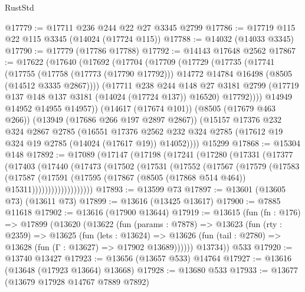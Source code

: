 \begin{lexlean}{RustStd}
\begin{coremodule}
@17779 := @17711 @236 @244 @22 @27 @3345 @2799
@17786 := @17719 @115 @22 @115 @3345 (@14024 (@17724 @115))
@17788 := @14032 (@14033 @3345)
@17790 := @17779 (@17786 @17788)
@17792 := @14143 @17648 @2562
@17867 := @17622
    (@17640
      (@17692
        (@17704
          (@17709
            (@17729
              (@17735
                (@17741
                  (@17755
                    (@17758 (@17773 (@17790 @17792)))
                    @14772
                    @14784
                    @16498
                    (@8505 (@14512 @3335 @2867))))
                (@17711
                  @238
                  @244
                  @148
                  @27
                  @3181
                  @2799
                  (@17719 @137 @148 @137 @3181 (@14024 (@17724 @137)) @16520)
                  @17792))))
          @14949
          @14952
          @14955
          @14957))
      (@14617 (@17674 @101))
      (@8505 (@17679 @463 @266))
      (@13949 (@17686 @266 @197 @2897 @2867))
      (@15157
        @17376
        @232
        @324
        @2867
        @2785
        (@16551
          @17376
          @2562
          @232
          @324
          @2785
          (@17612 @19 @324 @19 @2785 (@14024 (@17617 @19)) @14052))))
    @15299
@17868 := @15304 @148
@17892 := @17089
    (@17147
      (@17198
        (@17241
          (@17280
            (@17331
              (@17377
                (@17403
                  (@17440
                    (@17473
                      (@17502
                        (@17531
                          (@17552
                            (@17567
                              (@17579
                                (@17583
                                  (@17587
                                    (@17591
                                      (@17595
                                        (@17867 (@8505 (@17868 @514 @464)) @15311)))))))))))))))))))
@17893 := @13599 @73
@17897 := @13601 (@13605 @73) (@13611 @73)
@17899 := @13616 (@13425 @13617)
@17900 := @7885 @11618
@17902 := @13616 (@17900 @13644)
@17919 := @13615
    (fun (fn : @176) =>
    @17899
      (@13620
        (@13622
          (fun (params : @7878) =>
          @13623
            (fun (rty : @2359) =>
            @13625
              (fun (lets : @13624) =>
              @13626 (fun (tail : @2780) => @13628 (fun (Γ : @13627) => @17902 @13689))))))
        @13734))
    @533
@17920 := @13740 @13427
@17923 := @13656 (@13657 @533) @14764
@17927 := @13616 (@13648 (@17923 @13664) @13668)
@17928 := @13680 @533
@17933 := @13677 (@13679 @17928 @14767 @7889 @7892)

\end{coremodule}
\end{lexlean}
